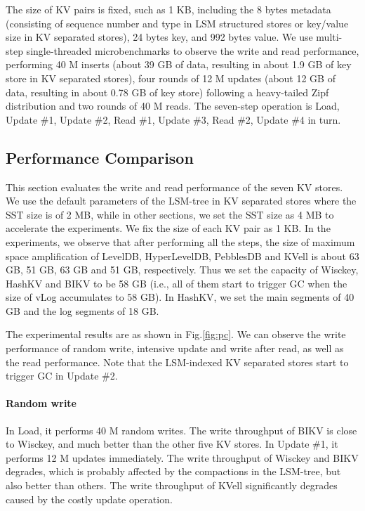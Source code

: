 \documentclass[sigconf]{acmart}
\begin{document}
The size of KV pairs is fixed, such as 1 KB, including the 8 bytes metadata (consisting of sequence number and type in LSM structured stores or key/value size in KV separated stores), 24 bytes key, and 992 bytes value. We use multi-step single-threaded microbenchmarks to observe the write and read performance, performing 40 M inserts (about 39 GB of data, resulting in about 1.9 GB of key store in KV separated stores), four rounds of 12 M updates (about 12 GB of data, resulting in about 0.78 GB of key store) following a heavy-tailed Zipf distribution and two rounds of 40 M reads. The seven-step operation is Load, Update \#1, Update \#2, Read \#1, Update \#3, Read \#2, Update \#4 in turn. 

\subsection{Performance Comparison}
This section evaluates the write and read performance of the seven KV stores. We use the default parameters of the LSM-tree in KV separated stores where the SST size is of 2 MB, while in other sections, we set the SST size as 4 MB to accelerate the experiments. We fix the size of each KV pair as 1 KB. In the experiments, we observe that after performing all the steps, the size of maximum space amplification of LevelDB, HyperLevelDB, PebblesDB and KVell is about 63 GB, 51 GB, 63 GB and 51 GB, respectively. Thus we set the capacity of Wisckey, HashKV and BIKV to be 58 GB (i.e., all of them start to trigger GC when the size of vLog accumulates to 58 GB). In HashKV, we set the main segments of 40 GB and the log segments of 18 GB. 

The experimental results are as shown in Fig.\ref{fig:pc}. We can observe the write performance of random write, intensive update and write after read, as well as the read performance. Note that the LSM-indexed KV separated stores start to trigger GC in Update \#2.

\paragraph*{Random write}
In Load, it performs 40 M random writes. The write throughput of BIKV is close to Wisckey, and much better than the other five KV stores. In Update \#1, it performs 12 M updates immediately. The write throughput of Wisckey and BIKV degrades, which is probably affected by the compactions in the LSM-tree, but also better than others. The write throughput of KVell significantly degrades caused by the costly update operation.
\end{document}

